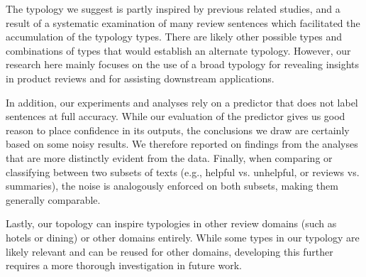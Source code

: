 The typology we suggest is partly inspired by previous related studies, and a result of a systematic examination of many review sentences which facilitated the accumulation of the typology types. There are likely other possible types and combinations of types that would establish an alternate typology. However, our research here mainly focuses on the use of a broad typology for revealing insights in product reviews and for assisting downstream applications.

In addition, our experiments and analyses rely on a predictor that does not label sentences at full accuracy. While our evaluation of the predictor gives us good reason to place confidence in its outputs, the conclusions we draw are certainly based on some noisy results. We therefore reported on findings from the analyses that are more distinctly evident from the data. Finally, when comparing or classifying between two subsets of texts (e.g., helpful vs. unhelpful, or reviews vs. summaries), the noise is analogously enforced on both subsets, making them generally comparable.

Lastly, our topology can inspire typologies in other review domains (such as hotels or dining) or other domains entirely. While some types in our typology are likely relevant and can be reused for other domains, developing this further requires a more thorough investigation in future work.